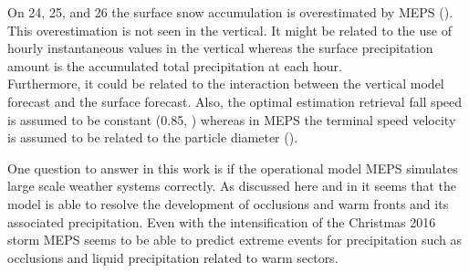 On \num{24}, \num{25}, and \SI{26}{\dec} the surface snow accumulation is overestimated by MEPS (). This overestimation is not seen in the vertical. It might be related to the use of hourly instantaneous values in the vertical whereas the surface precipitation amount is the accumulated total precipitation at each hour. 
\\
Furthermore, it could be related to the interaction between the vertical model forecast and the surface forecast. Also, the optimal estimation retrieval fall speed is assumed to be constant (\SI{0.85}{\mPs}, ) whereas in MEPS the terminal speed velocity is assumed to be related to the particle diameter (). %
\par\medskip
\noindent
One question to answer in this work is if the operational model MEPS simulates large scale weather systems correctly. As discussed here and in  it seems that the model is able to resolve the development of occlusions and warm fronts and its associated precipitation. Even with the intensification of the Christmas 2016 storm MEPS seems to be able to predict extreme events for precipitation such as occlusions and liquid precipitation related to warm sectors. %
